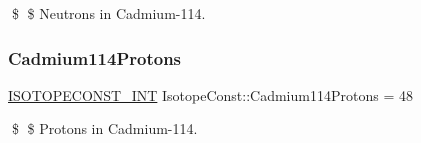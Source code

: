\$ \$ Neutrons in Cadmium-\/114. \mbox{\label{group___isotope_const-_cadmium-_cd114_ga3fcc86c15d983e409a2fe22e88c5fe9d}} 
\subsubsection{\texorpdfstring{Cadmium114\+Protons}{Cadmium114Protons}}
{\footnotesize\ttfamily \mbox{\hyperlink{group___isotope_const-_macros_ga5f18360b3e99483a35c32d789e62621c}{I\+S\+O\+T\+O\+P\+E\+C\+O\+N\+S\+T\+\_\+\+I\+NT}} Isotope\+Const\+::\+Cadmium114\+Protons = 48}

\$ \$ Protons in Cadmium-\/114. 